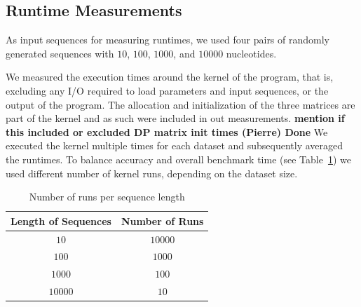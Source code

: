 \documentclass[runningheads,a4paper]{llncs}
\begin{document}
\subsection{Runtime Measurements}
\label{team2-runtimes}

As input sequences for measuring runtimes,  we used four pairs of randomly generated sequences with $10$, $100$, $1000$, and $10000$ nucleotides. 

We measured the execution times around the kernel of the program, that is, excluding any I/O required to load parameters and input sequences, or the output of the program. The allocation and initialization of the three matrices are part of the kernel and as such were included in out measurements.
{\bf mention if this included or excluded DP matrix init times (Pierre) Done}
We executed the kernel multiple times for each dataset and subsequently averaged the runtimes. 
To balance accuracy and overall benchmark time (see Table~\ref{fig:runs}) we used different number of kernel runs, depending on the dataset size.

\begin{table}
\centering

\begin{tabular}{|c|c|}
\hline 
Length of Sequences & Number of Runs \\ 
\hline 
$10$ & $10000$ \\ 
\hline 
$100$ & $1000$ \\ 
\hline 
$1000$ & $100$ \\ 
\hline 
$10000$ & $10$ \\ 
\hline 
\end{tabular}
\caption{Number of runs per sequence length}
\label{fig:runs}
\end{table}
\end{document}
